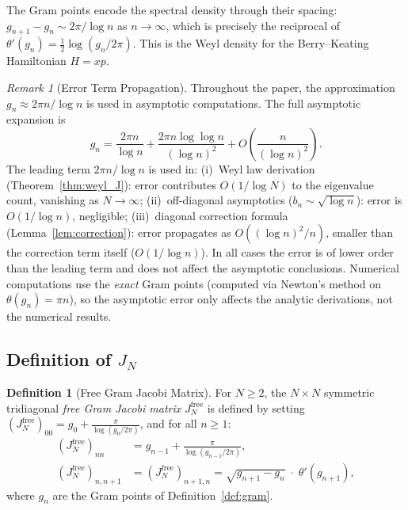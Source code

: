\documentclass{pre-aomart}
\theoremstyle{plain}
\theoremstyle{definition}
\newtheorem{definition}[theorem]{Definition}
\theoremstyle{remark}
\newtheorem{remark}[theorem]{Remark}
\begin{document}
The Gram points encode the spectral density through their spacing:
$g_{n+1} - g_n \sim 2\pi / \log n$ as $n \to \infty$, which is precisely
the reciprocal of $\theta'(g_n) = \frac12 \log(g_n/2\pi)$.  This is the
Weyl density for the Berry--Keating Hamiltonian $H = xp$.

\begin{remark}[Error Term Propagation]\label{rem:gram_error}
Throughout the paper, the approximation $g_n \approx 2\pi n/\log n$ is used
in asymptotic computations.  The full asymptotic expansion is
\[
g_n = \frac{2\pi n}{\log n} + \frac{2\pi n \log\log n}{(\log n)^2}
      + O\!\left(\frac{n}{(\log n)^2}\right).
\]
The leading term $2\pi n/\log n$ is used in:
(i)~Weyl law derivation (Theorem~\ref{thm:weyl_J}): error contributes
$O(1/\log N)$ to the eigenvalue count, vanishing as $N \to \infty$;
(ii)~off-diagonal asymptotics ($b_n \sim \sqrt{\log n}$): error is
$O(1/\log n)$, negligible;
(iii)~diagonal correction formula (Lemma~\ref{lem:correction}): error
propagates as $O((\log n)^2/n)$, smaller than the correction term itself
($O(1/\log n)$).
In all cases the error is of lower order than the leading term and does not
affect the asymptotic conclusions.  Numerical computations use the \emph{exact}
Gram points (computed via Newton's method on $\theta(g_n) = \pi n$), so the
asymptotic error only affects the analytic derivations, not the numerical results.
\end{remark}

\subsection{Definition of \texorpdfstring{$J_N$}{J\_N}}

\begin{definition}[Free Gram Jacobi Matrix]\label{def:J_N_free}
For $N \ge 2$, the $N \times N$ symmetric tridiagonal \emph{free Gram Jacobi
matrix} $J_N^{\mathrm{free}}$ is defined by setting $(J_N^{\mathrm{free}})_{00} = g_0 + \frac{\pi}{\log(g_0/2\pi)}$, and for all $n \ge 1$:
\begin{align}
(J_N^{\mathrm{free}})_{nn} &= g_{n-1} + \frac{\pi}{\log(g_{n-1}/2\pi)}, \label{eq:Jnn}\\
(J_N^{\mathrm{free}})_{n,n+1} &= (J_N^{\mathrm{free}})_{n+1,n}
               = \sqrt{g_{n+1} - g_n}\; \cdot\; \theta'(g_{n+1}), \label{eq:Joff}
\end{align}
where $g_n$ are the Gram points of Definition~\ref{def:gram}.
\end{definition}
\end{document}
